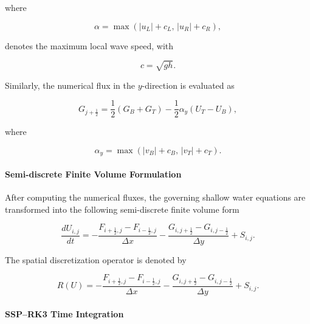 \documentclass[12pt]{article}
\begin{document}
where

\begin{equation}
\alpha
=
\max
\left(
|u_L|+c_L,\,
|u_R|+c_R
\right),
\label{eq:alpha}
\end{equation}

denotes the maximum local wave speed, with

\begin{equation}
c=\sqrt{gh}.
\label{eq:wavespeed}
\end{equation}

Similarly, the numerical flux in the $y$-direction is evaluated as

\begin{equation}
G_{j+\frac{1}{2}}
=
\frac{1}{2}
\left(
G_B+G_T
\right)
-
\frac{1}{2}
\alpha_y
\left(
U_T-U_B
\right),
\label{eq:rusanov_y}
\end{equation}

where

\begin{equation}
\alpha_y
=
\max
\left(
|v_B|+c_B,\,
|v_T|+c_T
\right).
\label{eq:alpha_y}
\end{equation}

\paragraph{Semi-discrete Finite Volume Formulation}

After computing the numerical fluxes, the governing shallow water equations are transformed into the following semi-discrete finite volume form

\begin{equation}
\frac{dU_{i,j}}{dt}
=
-
\frac{
F_{i+\frac{1}{2},j}
-
F_{i-\frac{1}{2},j}
}{\Delta x}
-
\frac{
G_{i,j+\frac{1}{2}}
-
G_{i,j-\frac{1}{2}}
}{\Delta y}
+
S_{i,j}.
\label{eq:semidiscrete}
\end{equation}

The spatial discretization operator is denoted by

\begin{equation}
R(U)
=
-
\frac{
F_{i+\frac{1}{2},j}
-
F_{i-\frac{1}{2},j}
}{\Delta x}
-
\frac{
G_{i,j+\frac{1}{2}}
-
G_{i,j-\frac{1}{2}}
}{\Delta y}
+
S_{i,j}.
\label{eq:residual}
\end{equation}

\paragraph{SSP--RK3 Time Integration}
\end{document}
